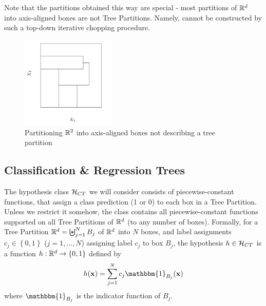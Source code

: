 Note that the partitions obtained this way are special - most partitions of $\mathbb{R}^d$ into axis-aligned boxes are not Tree Partitions. Namely, cannot be constructed by such a top-down iterative chopping procedure.
\begin{figure}[h!]
	\centering
	\includegraphics[width=0.4\textwidth]{chapters/classification/figures/axis_parallel_partition.png}
	\caption{Partitioning $\mathbb{R}^2$ into axis-aligned boxes not describing a tree partition}
\end{figure}

\subsection{Classification \& Regression Trees}
The hypothesis class $\mathcal{H}_{CT}$  we will consider consists of piecewise-constant functions, that assign a class prediction (1 or 0) to each box in a Tree Partition. Unless we restrict it somehow, the class contains all piecewise-constant functions supported on all Tree Partitions of $\mathbb{R}^d$ (to any number of boxes). Formally, for a Tree Partition $\mathbb{R}^d=\biguplus_{j=1}^N B_j$ of $\mathbb{R}^d$ into $N$ boxes, and label assignments $c_j \in \left\{ 0,1\right\}$ ($j=1,\ldots, N$) assigning label $c_j$ to box $B_j$, the hypothesis $h\in\mathcal{H}_{CT}$ is a function $h:\mathbb{R}^d\to\left\{ 0,1 \right\}$ defined by $$ h(\x) = \sum_{j=1}^N c_j \mathbbm{1}_{B_j}(\x) $$ where $\mathbbm{1}_{B_j}$ is the indicator function of $B_j$. 

